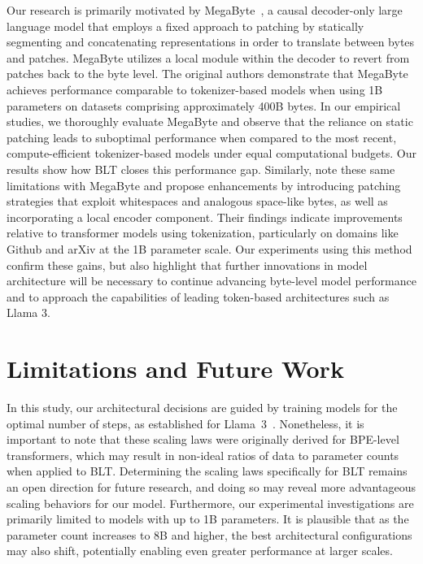 Our research is primarily motivated by MegaByte~\citep{yu2023megabyte}, a causal decoder-only large language model that employs a fixed approach to patching by statically segmenting and concatenating representations in order to translate between bytes and patches. MegaByte utilizes a local module within the decoder to revert from patches back to the byte level. The original authors demonstrate that MegaByte achieves performance comparable to tokenizer-based models when using 1B parameters on datasets comprising approximately 400B bytes. In our empirical studies, we thoroughly evaluate MegaByte and observe that the reliance on static patching leads to suboptimal performance when compared to the most recent, compute-efficient tokenizer-based models under equal computational budgets. Our results show how {\textsc BLT} closes this performance gap. Similarly, \cite{slagle2024spacebyte} note these same limitations with MegaByte and propose enhancements by introducing patching strategies that exploit whitespaces and analogous space-like bytes, as well as incorporating a local encoder component. Their findings indicate improvements relative to transformer models using tokenization, particularly on domains like Github and arXiv at the 1B parameter scale. Our experiments using this method confirm these gains, but also highlight that further innovations in model architecture will be necessary to continue advancing byte-level model performance and to approach the capabilities of leading token-based architectures such as Llama 3.

\section{Limitations and Future Work}

In this study, our architectural decisions are guided by training models for the optimal number of steps, as established for Llama~3~\citep{dubey2024llama}. Nonetheless, it is important to note that these scaling laws were originally derived for BPE-level transformers, which may result in non-ideal ratios of data to parameter counts when applied to {\textsc BLT}. Determining the scaling laws specifically for {\textsc BLT} remains an open direction for future research, and doing so may reveal more advantageous scaling behaviors for our model. Furthermore, our experimental investigations are primarily limited to models with up to 1B parameters. It is plausible that as the parameter count increases to 8B and higher, the best architectural configurations may also shift, potentially enabling even greater performance at larger scales.

